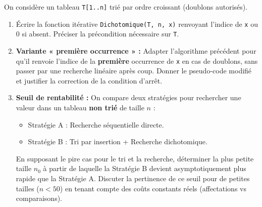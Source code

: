 \documentclass[11pt]{article}
\begin{document}
\begin{exercice}
On considère un tableau \texttt{T[1..n]} trié par ordre croissant (doublons autorisés).
\begin{enumerate}
    \item Écrire la fonction itérative \texttt{Dichotomique(T, n, x)} renvoyant l'indice de \texttt{x} ou 0 si absent. Préciser la précondition nécessaire sur \texttt{T}.
    \item \textbf{Variante « première occurrence » :} Adapter l'algorithme précédent pour qu'il renvoie l'indice de la \textbf{première} occurrence de \texttt{x} en cas de doublons, sans passer par une recherche linéaire après coup. Donner le pseudo-code modifié et justifier la correction de la condition d'arrêt.
    \item \textbf{Seuil de rentabilité :} On compare deux stratégies pour rechercher une valeur dans un tableau \textbf{non trié} de taille $n$ :
    \begin{itemize}
        \item Stratégie A : Recherche séquentielle directe.
        \item Stratégie B : Tri par insertion + Recherche dichotomique.
    \end{itemize}
    En supposant le pire cas pour le tri et la recherche, déterminer la plus petite taille $n_0$ à partir de laquelle la Stratégie B devient asymptotiquement plus rapide que la Stratégie A. Discuter la pertinence de ce seuil pour de petites tailles ($n < 50$) en tenant compte des coûts constants réels (affectations vs comparaisons).
\end{enumerate}
\end{exercice}
\end{document}
